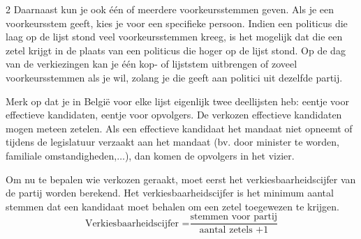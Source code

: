 \begin{multicols}{2}
Daarnaast kun je ook één of meerdere voorkeursstemmen geven. Als je een voorkeursstem geeft, kies je voor een specifieke persoon. Indien een politicus die laag op de lijst stond veel voorkeursstemmen kreeg, is het mogelijk dat die een zetel krijgt in de plaats van een politicus die hoger op de lijst stond. Op de dag van de verkiezingen kan je één kop- of lijststem uitbrengen of zoveel voorkeursstemmen als je wil, zolang je die geeft aan politici uit dezelfde partij. 

Merk op dat je in België voor elke lijst eigenlijk twee deellijsten heb: eentje voor effectieve kandidaten, eentje voor opvolgers. De verkozen effectieve kandidaten mogen meteen zetelen. Als een effectieve kandidaat het mandaat niet opneemt of tijdens de legislatuur verzaakt aan het mandaat (bv. door minister te worden, familiale omstandigheden,$\ldots$), dan komen de opvolgers in het vizier.

Om nu te bepalen wie verkozen geraakt, moet eerst het verkiesbaarheidscijfer van de partij worden berekend. Het verkiesbaarheidscijfer is het minimum aantal stemmen dat een kandidaat moet behalen om een zetel toegewezen te krijgen. 
$$\text{Verkiesbaarheidscijfer =} \frac{\text{stemmen voor partij}}{\text{aantal zetels +1}}$$


\end{multicols}
